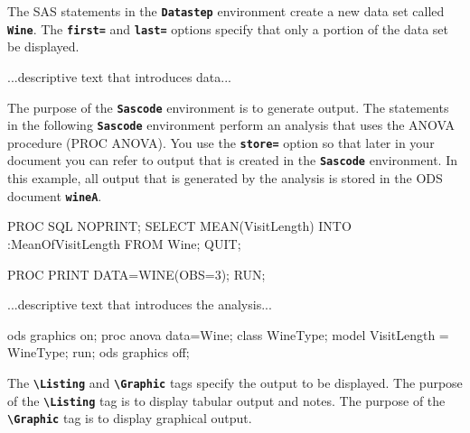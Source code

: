 \documentclass{article}
\newcommand*{\Code}[1]{\texttt{\textbf{#1}}}
\newcommand*{\cs}[1]{\texttt{\textbf{\textbackslash#1}}}
\begin{document}
The SAS statements in the \Code{Datastep} environment create a new data set
called \Code{Wine}. The \Code{first=} and \Code{last=} options specify that
only a portion of the data set be displayed.

...descriptive text that introduces data...




The purpose of the \Code{Sascode} environment is to generate output.
The statements in the following \Code{Sascode} environment perform an
analysis that uses the ANOVA procedure (PROC ANOVA).
You use the \Code{store=} option so that
later in your document
you can refer to output that is created in the \Code{Sascode}
environment.
In this example, all output that is generated by the analysis is stored in the ODS document
\Code{wineA}.

\begin{Sascode}[store=quickstart]
PROC SQL NOPRINT;
SELECT MEAN(VisitLength) 
INTO :MeanOfVisitLength
FROM Wine;
QUIT;

PROC PRINT DATA=WINE(OBS=3);
RUN;

\end{Sascode}



...descriptive text that introduces the analysis...

\begin{Sascode}[store=wineA]
ods graphics on;
proc anova data=Wine;
   class WineType;
   model VisitLength = WineType;
run;
ods graphics off;
\end{Sascode}
The \cs{Listing} and \cs{Graphic} tags specify the output to be displayed.
The purpose of the \cs{Listing} tag is to display tabular output and notes.
The purpose of the \cs{Graphic} tag is to display graphical output.
\end{document}
